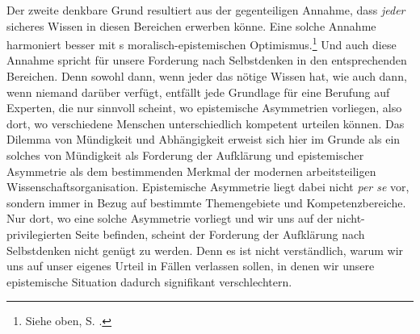 \begin{nummerierung}
\item Der zweite denkbare Grund resultiert aus der gegenteiligen Annahme, dass
\emph{jeder} sicheres Wissen in diesen Bereichen erwerben könne. Eine solche
Annahme harmoniert besser mit s moralisch-epistemischen
Optimismus.\footnote{Siehe oben, S.
\pageref{Fussnote:moralischepistemischerOptimismus}.} Und auch diese Annahme
spricht für unsere Forderung nach Selbstdenken in den entsprechenden Bereichen.
Denn sowohl dann, wenn jeder das nötige Wissen hat, wie auch dann, wenn niemand
darüber verfügt, entfällt jede Grundlage für eine Berufung auf Experten, die nur
sinnvoll scheint, wo epistemische Asymmetrien vorliegen, also dort, wo
verschiedene Menschen unterschiedlich kompetent urteilen können. Das Dilemma von
Mündigkeit und Abhängigkeit erweist sich hier im Grunde als ein solches von
Mündigkeit als Forderung der Aufklärung und epistemischer Asymmetrie als dem
bestimmenden Merkmal der modernen arbeitsteiligen Wissenschaftsorganisation.
Epistemische Asymmetrie liegt dabei nicht \emph{per se} vor, sondern immer in
Bezug auf bestimmte Themengebiete und Kompetenzbereiche. Nur dort, wo eine
solche Asymmetrie vorliegt und wir uns auf der nicht-privilegierten Seite
befinden, scheint der Forderung der Aufklärung nach Selbstdenken nicht genügt zu
werden. Denn es ist nicht verständlich, warum wir uns auf unser eigenes Urteil
in Fällen verlassen sollen, in denen wir unsere epistemische Situation dadurch
signifikant verschlechtern.
\end{nummerierung}

